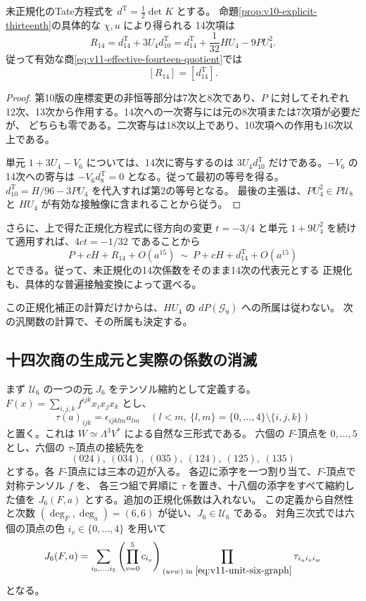 \begin{proposition}[14次項の正規化補正]
\label{prop:v11-actual-fourteen-correction}
未正規化のTate方程式を $d^{\mathrm T}=\tfrac12\det K$ とする。
命題\ref{prop:v10-explicit-thirteenth}の具体的な $\chi,u$ により得られる
14次項は
\begin{equation}\label{eq:v11-fourteen-corrected}
 R_{14}
 =d^{\mathrm T}_{14}+3U_4d^{\mathrm T}_{10}
 =d^{\mathrm T}_{14}+\frac1{32}HU_4-9PU_4^2.
\end{equation}
従って有効な商\eqref{eq:v11-effective-fourteen-quotient}では
\[
 [R_{14}]=[d^{\mathrm T}_{14}].
\]
\end{proposition}
\begin{proof}
第10版の座標変更の非恒等部分は7次と8次であり、$P$ に対してそれぞれ
12次、13次から作用する。14次への一次寄与には元の8次項または7次項が必要だが、
どちらも零である。二次寄与は18次以上であり、10次項への作用も16次以上である。

単元 $1+3U_4-V_6$ については、14次に寄与するのは
$3U_4d^{\mathrm T}_{10}$ だけである。$-V_6$ の14次への寄与は
$-V_6d^{\mathrm T}_8=0$ となる。従って最初の等号を得る。
$d^{\mathrm T}_{10}=H/96-3PU_4$ を代入すれば第2の等号となる。
最後の主張は、$PU_4^2\in P\mathcal U_8$ と
$HU_4$ が有効な接触像に含まれることから従う。
\end{proof}

さらに、上で得た正規化方程式に径方向の変更 $t=-3/4$ と単元
$1+9U_4^2$ を続けて適用すれば、$4ct=-1/32$ であることから
\[
 P+cH+R_{14}+O(a^{15})
 \ \sim\ P+cH+d^{\mathrm T}_{14}+O(a^{15})
\]
とできる。従って、未正規化の14次係数をそのまま14次の代表元とする
正規化も、具体的な普遍接触変換によって選べる。

この正規化補正の計算だけからは、$HU_4$ の $dP(\mathcal G_9)$ への所属は従わない。
次の汎関数の計算で、その所属も決定する。

\subsection{十四次商の生成元と実際の係数の消滅}\label{subsec:v11-fourteenth-complement}

まず \(\mathcal U_6\) の一つの元 \(J_6\) をテンソル縮約として定義する。
\(F(x)=\sum_{i,j,k}f^{ijk}x_ix_jx_k\) とし、
\[
 \tau(a)_{ijk}=\epsilon_{ijklm}a_{lm}\quad(l<m,
       \ \{l,m\}=\{0,\ldots,4\}\setminus\{i,j,k\})
\]
と置く。これは \(W\simeq\Lambda^3V^*\) による自然な三形式である。
六個の \(F\)-頂点を \(0,\ldots,5\) とし、六個の \(\tau\)-頂点の接続先を
\begin{equation}\label{eq:v11-unit-six-graph}
 (024),\ (034),\ (035),\ (124),\ (125),\ (135)
\end{equation}
とする。各 \(F\)-頂点には三本の辺が入る。
各辺に添字を一つ割り当て、\(F\)-頂点で対称テンソル \(f\) を、
各三つ組で昇順に \(\tau\) を置き、十八個の添字をすべて縮約した値を
\(J_6(F,a)\) とする。追加の正規化係数は入れない。
この定義から自然性と次数 \((\deg_F,\deg_a)=(6,6)\) が従い、\(J_6\in\mathcal U_6\) である。
対角三次式では六個の頂点の色 \(i_v\in\{0,\ldots,4\}\) を用いて
\[
 J_6(F,a)=\sum_{i_0,\ldots,i_5}
      \left(\prod_{v=0}^5c_{i_v}\right)
      \prod_{(uvw)\text{ in }\eqref{eq:v11-unit-six-graph}}
                   \tau_{i_ui_vi_w}
\]
となる。

